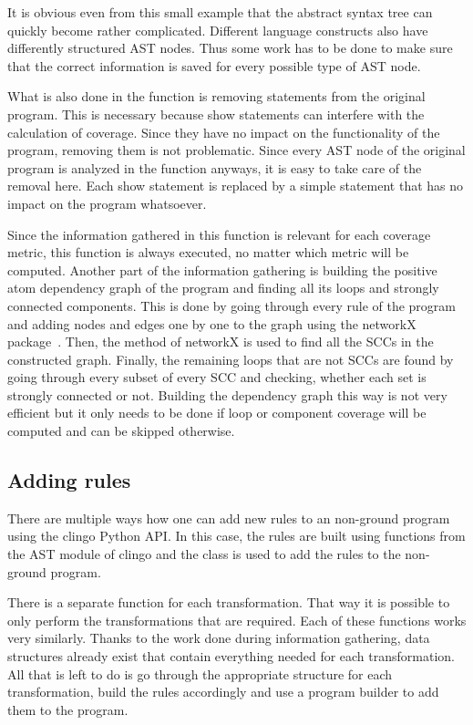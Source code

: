 It is obvious even from this small example that the abstract syntax tree can quickly become rather complicated. Different language constructs also have differently structured AST nodes.
Thus some work has to be done to make sure that the correct information is saved for every possible type of AST node.

What is also done in the  function is removing  statements from the original program. This is necessary because show statements can interfere with the calculation of coverage. Since they have no impact on the functionality of the program, removing them is not problematic. Since every AST node of the original program is analyzed in the  function anyways, it is easy to take care of the removal here. Each show statement is replaced by a simple  statement that has no impact on the program whatsoever.

Since the information gathered in this function is relevant for each coverage metric, this function is always executed, no matter which metric will be computed. Another part of the information gathering is building the positive atom dependency graph of the program and finding all its loops and strongly connected components. This is done by going through every rule of the program and adding nodes and edges one by one to the graph using the networkX package~\cite{HSS08}. Then, the  method of networkX is used to find all the SCCs in the constructed graph. Finally, the remaining loops that are not SCCs are found by going through every subset of every SCC and checking, whether each set is strongly connected or not. Building the dependency graph this way is not very efficient but it only needs to be done if loop or component coverage will be computed and can be skipped otherwise.

\subsection{Adding rules}
\label{subsec:Computing coverage metrics for propositional programs/Implementation details/Adding rules}
There are multiple ways how one can add new rules to an non-ground program using the clingo Python API. In this case, the rules are built using functions from the AST module of clingo and the  class is used to add the rules to the non-ground program. 

There is a separate function for each transformation. That way it is possible to only perform the transformations that are required. Each of these functions works very similarly. Thanks to the work done during information gathering, data structures already exist that contain everything needed for each transformation. All that is left to do is go through the appropriate structure for each transformation, build the rules accordingly and use a program builder to add them to the program.

